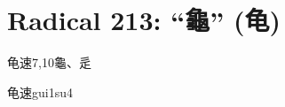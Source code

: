 
\section*{Radical 213: ``⿔'' (龟)}

\begin{entry}{龟速}{7,10}{⿔、⾡}
  \begin{phonetics}{龟速}{gui1su4}
  \end{phonetics}
\end{entry}


